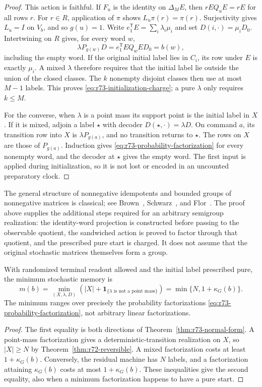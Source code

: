 \begin{proof}
This action is faithful. If $F_u$ is the identity on $\Delta_ME$, then
$rEQ_uE=rE$ for all rows $r$. For $r\in R$, application of $\pi$ shows
$L_u\pi(r)=\pi(r)$. Surjectivity gives $L_u=I$ on $V_b$, and so $g(u)=1$.
Write $e_1^{\mathsf T}E=\sum_i\lambda_i\mu_i$ and set
$D(i,\cdot)=\mu_iD_0$. Intertwining on $R$ gives, for every word $w$,
\[
 \lambda P_{g(w)}D=e_1^{\mathsf T}EQ_wED_0=b(w),
\]
including the empty word. If the original initial label lies in $C_i$, its
row under $E$ is exactly $\mu_i$. A mixed $\lambda$ therefore requires that
the initial label lie outside the union of the closed classes. The $k$
nonempty disjoint classes then use at most $M-1$ labels. This proves
\eqref{eq:r73-initialization-charge}; a pure $\lambda$ only requires $k\le M$.

For the converse, when $\lambda$ is a point mass its support point is the
initial label in $X$. If it is mixed, adjoin a label $\star$ with decoder
$D(\star,\cdot)=\lambda D$. On command $a$, its transition row into $X$ is
$\lambda P_{g(a)}$, and no transition returns to $\star$. The rows on $X$
are those of $P_{g(a)}$. Induction gives \eqref{eq:r73-probability-factorization}
for every nonempty word, and the decoder at $\star$ gives the empty word.
The first input is applied during initialization, so it is not lost or
encoded in an uncounted preparatory clock.
\end{proof}

The general structure of nonnegative idempotents and bounded groups of
nonnegative matrices is classical; see Brown~\cite{Brown64},
Schwarz~\cite{Schwarz64}, and Flor~\cite{Flor69}. The proof above supplies the
additional steps required for an arbitrary semigroup realization: the
identity-word projection is constructed before passing to the observable
quotient, the sandwiched action is proved to factor through that quotient,
and the prescribed pure start is charged. It does not assume that the
original stochastic matrices themselves form a group.

\begin{theorem}\label{thm:r73-memory-formula}
With randomized terminal readout allowed and the initial label prescribed
pure, the minimum stochastic memory is
\begin{equation}\label{eq:r73-memory-formula}
 m(b)=\min_{(X,\lambda,D)}
 \left(|X|+\mathbf1_{\{\lambda\text{ is not a point mass}\}}\right)
 =\min\{N,1+\kappa_G(b)\}.
\end{equation}
The minimum ranges over precisely the probability factorizations
\eqref{eq:r73-probability-factorization}, not arbitrary linear factorizations.
\end{theorem}
\begin{proof}
The first equality is both directions of Theorem~\ref{thm:r73-normal-form}.
A point-mass factorization gives a deterministic-transition realization on
$X$, so $|X|\ge N$ by Theorem~\ref{thm:r72-reversible}. A mixed factorization
costs at least $1+\kappa_G(b)$. Conversely, the residual machine has $N$
labels, and a factorization attaining $\kappa_G(b)$ costs at most
$1+\kappa_G(b)$. These inequalities give the second equality, also when a
minimum factorization happens to have a pure start.
\end{proof}


